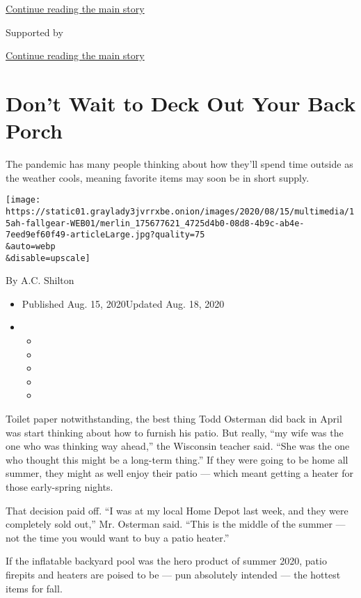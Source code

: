 \protect\hyperlink{after-top}{Continue reading the main story}

Supported by

\protect\hyperlink{after-sponsor}{Continue reading the main story}

\hypertarget{dont-wait-to-deck-out-your-back-porch}{%
\section{Don't Wait to Deck Out Your Back
Porch}\label{dont-wait-to-deck-out-your-back-porch}}

The pandemic has many people thinking about how they'll spend time
outside as the weather cools, meaning favorite items may soon be in
short supply.

\texttt{[image: https://static01.graylady3jvrrxbe.onion/images/2020/08/15/multimedia/15ah-fallgear-WEB01/merlin\_175677621\_4725d4b0-08d8-4b9c-ab4e-7eed9ef60f49-articleLarge.jpg?quality=75\\\&auto=webp\\\&disable=upscale]}

By A.C. Shilton

\begin{itemize}
\item
  Published Aug. 15, 2020Updated Aug. 18, 2020
\item
  \begin{itemize}
  \item
  \item
  \item
  \item
  \item
  \end{itemize}
\end{itemize}

Toilet paper notwithstanding, the best thing Todd Osterman did back in
April was start thinking about how to furnish his patio. But really,
``my wife was the one who was thinking way ahead,'' the Wisconsin
teacher said. ``She was the one who thought this might be a long-term
thing.'' If they were going to be home all summer, they might as well
enjoy their patio --- which meant getting a heater for those
early-spring nights.

That decision paid off. ``I was at my local Home Depot last week, and
they were completely sold out,'' Mr. Osterman said. ``This is the middle
of the summer --- not the time you would want to buy a patio heater.''

If the inflatable backyard pool was the hero product of summer 2020,
patio firepits and heaters are poised to be --- pun absolutely intended
--- the hottest items for fall.

